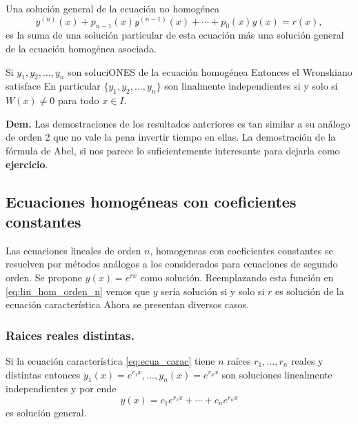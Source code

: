 \begin{teorema}{}
Una solución general de la ecuación no homogénea
\[y^{(n)}(x)+p_{n-1}(x)y^{(n-1)}(x)+\cdots+p_0(x)y(x)=r(x),\]
es la suma de una solución particular de esta ecuación más una solución general de la ecuación homogénea asociada.
\end{teorema}






\begin{teorema}{}
Si $y_1,y_2,\ldots,y_n$ son soluciONES de la ecuación  homogénea
Entonces el Wronskiano satisface
En particular  $\{y_1,y_2,\ldots,y_n\}$ son linalmente independientes si y solo si $W(x)\neq 0$ para todo $x\in I$.
\end{teorema}

\textbf{Dem.} Las demostraciones de los resultados anteriores es tan similar a su análogo de orden 2 que no vale la pena invertir tiempo en ellas. La demostración de la fórmula de Abel, si nos parece lo suficientemente interesante para dejarla como \textbf{ejercicio}.



\subsection{Ecuaciones homogéneas con coeficientes constantes}
Las ecuaciones lineales de orden $n$, homogeneas con coeficientes constantes  se resuelven por métodos análogos a los considerados para ecuaciones de segundo orden. Se propone $y(x)=e^{rx}$ como solución. Reemplazando esta función
en \eqref{eq:lin_hom_orden_n} vemos que $y$ sería solución si y solo si $r$ es solución de la ecuación característica
Ahora se presentan diversos casos.



\subsubsection{Raices reales distintas.} Si la ecuación característica \eqref{eq:ecua_carac} tiene $n$ raíces $r_1,\ldots,r_n$ reales y distintas entonces
$y_1(x)=e^{r_1x},\ldots,y_n(x)=e^{r_nx}$ son soluciones linealmente independientes y por ende
\[\boxed{y(x)=c_1e^{r_1x}+\cdots+c_ne^{r_nx}}\]
es solución general.

